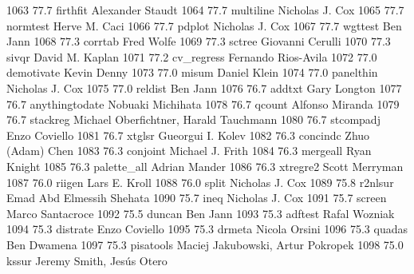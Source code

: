   1063     77.7    firthfit      Alexander Staudt                        
  1064     77.7    multiline     Nicholas J. Cox                         
  1065     77.7    normtest      Herve M. Caci                           
  1066     77.7    pdplot        Nicholas J. Cox                         
  1067     77.7    wgttest       Ben Jann                                
  1068     77.3    corrtab       Fred Wolfe                              
  1069     77.3    sctree        Giovanni Cerulli                        
  1070     77.3    sivqr         David M. Kaplan                         
  1071     77.2    cv_regress    Fernando Rios-Avila                     
  1072     77.0    demotivate    Kevin Denny                             
  1073     77.0    misum         Daniel Klein                            
  1074     77.0    panelthin     Nicholas J. Cox                         
  1075     77.0    reldist       Ben Jann                                
  1076     76.7    addtxt        Gary Longton                            
  1077     76.7    anythingtodate  Nobuaki Michihata                       
  1078     76.7    qcount        Alfonso Miranda                         
  1079     76.7    stackreg      Michael Oberfichtner, Harald Tauchmann  
  1080     76.7    stcompadj     Enzo Coviello                           
  1081     76.7    xtglsr        Gueorgui I. Kolev                       
  1082     76.3    concindc      Zhuo (Adam) Chen                        
  1083     76.3    conjoint      Michael J. Frith                        
  1084     76.3    mergeall      Ryan Knight                             
  1085     76.3    palette_all   Adrian Mander                           
  1086     76.3    xtregre2      Scott Merryman                          
  1087     76.0    riigen        Lars E. Kroll                           
  1088     76.0    split         Nicholas J. Cox                         
  1089     75.8    r2nlsur       Emad Abd Elmessih Shehata               
  1090     75.7    ineq          Nicholas J. Cox                         
  1091     75.7    screen        Marco Santacroce                        
  1092     75.5    duncan        Ben Jann                                
  1093     75.3    adftest       Rafal Wozniak                           
  1094     75.3    distrate      Enzo Coviello                           
  1095     75.3    drmeta        Nicola Orsini                           
  1096     75.3    quadas        Ben Dwamena                             
  1097     75.3    pisatools     Maciej Jakubowski, Artur Pokropek       
  1098     75.0    kssur         Jeremy Smith, Jesús Otero              

